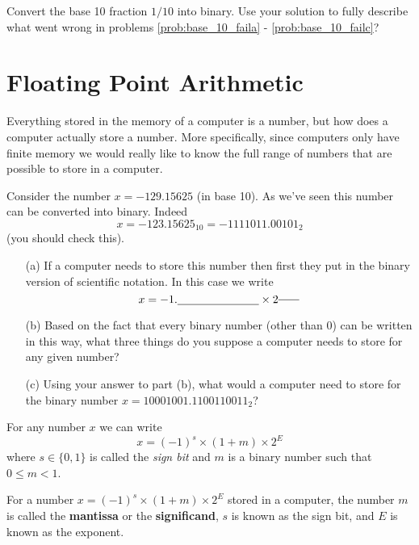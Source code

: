 \begin{problem}
    Convert the base 10 fraction $1/10$ into binary.  Use your solution to fully describe
    what went wrong in problems \ref{prob:base_10_faila} - \ref{prob:base_10_failc}?
\end{problem}



\newpage\section{Floating Point Arithmetic}
Everything stored in the memory of a computer is a number, but how does a computer
actually store a number.  More specifically, since computers only have finite memory we
would really like to know the full range of numbers that are possible to store in a
computer.  

\begin{problem}
    Consider the number $x = -129.15625$ (in base 10).  As we've seen this number can be
    converted into binary.  Indeed
    \[ x = -123.15625_{10} = -1111011.00101_2 \]
    (you should check this).  
    \begin{enumerate}
        \item[(a)] If a computer needs to store this number then first they put in the
            binary version of scientific notation.  In this case we write 
            \[ x = -1. \underline{\hspace{1in}} \times 2^{\underline{\hspace{0.25in}}} \]
            \solution{
                \[ -1.11101100101 \times 2^{6} \]
                }
        \item[(b)] Based on the fact that every binary number (other than 0) can be
            written in this way, what three things do you suppose a computer needs to
            store for any given number? 
        \item[(c)] Using your answer to part (b), what would a computer need to store for
            the binary number $x=10001001.1100110011_2$?
    \end{enumerate}
\end{problem}

For any number $x$ we can write
\[ x = (-1)^{s} \times (1+ m) \times 2^E \]
where $s \in \{0,1\}$ is called the {\it sign bit} and $m$ is a binary number such that $0
\le m < 1$.
\begin{definition}
    For a number $x = (-1)^{s} \times (1+m) \times 2^E$ stored in a computer, the number $m$
    is called the {\bf mantissa} or the {\bf significand}, $s$ is known as the sign bit,
    and $E$ is known as the exponent.
\end{definition}

